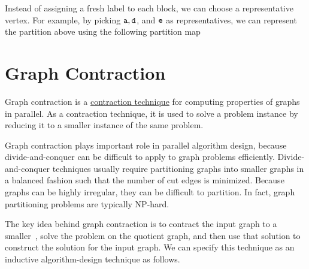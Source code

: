 \begin{flex}
\begin{example}
Instead of assigning a fresh label to each block, we can choose a
representative vertex.
%
For example, by picking $\texttt{a}, \texttt{d}$, and $\texttt{e}$ as
representatives, we can represent the partition above using the
following partition map

\end{example}
\end{flex}

\section{Graph Contraction}
\label{ex:graphcon::intro::graphcon}

\begin{gram}
\label{graphcon::intro::graphcon::overview}
Graph contraction is a 
%
\href{ch:design::contraction}{contraction technique}
%
for computing properties of graphs in parallel.
%
As a contraction technique, it is used to solve a problem
instance by reducing it to a smaller instance of the same problem.
%
%

Graph contraction plays important role in parallel algorithm design, because
divide-and-conquer can be difficult to apply to graph problems
efficiently.  
%
Divide-and-conquer techniques usually require partitioning graphs into
smaller graphs in a balanced fashion such that the number of cut edges
is minimized.  
%
Because graphs can be highly irregular, they can be difficult
to partition. 
%
In fact, graph partitioning problems are typically
NP-hard.
%
\end{gram}

\begin{gram}
\label{graphcon::intro::graphcon::quotient}
The key idea behind graph contraction is to contract the input graph
to a smaller~, solve the problem on the quotient
graph, and then use that solution to construct the solution for the
input graph.  
%
We can specify this technique as an inductive algorithm-design
technique as follows.
\end{gram}

